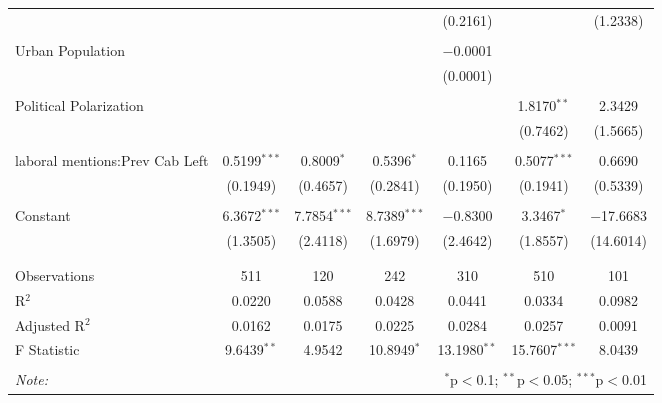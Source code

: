 \begin{table}[!htbp]
\begin{tabular}{@{\extracolsep{5pt}}lcccccc}
  &  &  &  & (0.2161) &  & (1.2338) \\ 
  & & & & & & \\ 
 Urban Population &  &  &  & $-$0.0001 &  &  \\ 
  &  &  &  & (0.0001) &  &  \\ 
  & & & & & & \\ 
 Political Polarization &  &  &  &  & 1.8170$^{**}$ & 2.3429 \\ 
  &  &  &  &  & (0.7462) & (1.5665) \\ 
  & & & & & & \\ 
 laboral mentions:Prev Cab Left & 0.5199$^{***}$ & 0.8009$^{*}$ & 0.5396$^{*}$ & 0.1165 & 0.5077$^{***}$ & 0.6690 \\ 
  & (0.1949) & (0.4657) & (0.2841) & (0.1950) & (0.1941) & (0.5339) \\ 
  & & & & & & \\ 
 Constant & 6.3672$^{***}$ & 7.7854$^{***}$ & 8.7389$^{***}$ & $-$0.8300 & 3.3467$^{*}$ & $-$17.6683 \\ 
  & (1.3505) & (2.4118) & (1.6979) & (2.4642) & (1.8557) & (14.6014) \\ 
  & & & & & & \\ 
\hline \\[-1.8ex] 
Observations & 511 & 120 & 242 & 310 & 510 & 101 \\ 
R$^{2}$ & 0.0220 & 0.0588 & 0.0428 & 0.0441 & 0.0334 & 0.0982 \\ 
Adjusted R$^{2}$ & 0.0162 & 0.0175 & 0.0225 & 0.0284 & 0.0257 & 0.0091 \\ 
F Statistic & 9.6439$^{**}$ & 4.9542 & 10.8949$^{*}$ & 13.1980$^{**}$ & 15.7607$^{***}$ & 8.0439 \\ 
\hline 
\hline \\[-1.8ex] 
\textit{Note:}  & \multicolumn{6}{r}{$^{*}$p$<$0.1; $^{**}$p$<$0.05; $^{***}$p$<$0.01} \\ 
\end{tabular} 
\end{table} 
